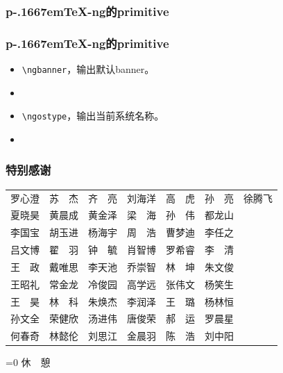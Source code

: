 \documentclass[dvipdfmx]{beamer}
\newcommand{\pTeX}{p\kern-.1667em\TeX}
\newcommand{\ptexng}{\pTeX-ng}
\begin{document}
%
\begin{frame}[fragile]
\frametitle{\bf \ptexng 的primitive}
\end{frame}
%
\begin{frame}[fragile]
\frametitle{\bf \ptexng 的primitive}
\begin{itemize}
\item \verb!\ngbanner!，输出默认banner。
\item \ngbanner
\item \verb!\ngostype!，输出当前系统名称。
\item \ngostype
\end{itemize}
\end{frame}
%
\begin{frame}[fragile]
\frametitle{\bf 特别感谢}
\begin{center}
\begin{tabular}{ccccccc}
罗心澄&苏　杰&齐　亮&刘海洋&高　虎&孙　亮&徐腾飞\\
夏晓昊&黄晨成&黄金泽&梁　海&孙　伟&都龙山&\\
李国宝&胡玉进&杨海宇&周　浩&曹梦迪&李任之&\\
吕文博&翟　羽&钟　毓&肖智博&罗希睿&李　清&\\
王　政&戴唯思&李天池&乔崇智&林　坤&朱文俊&\\
王昭礼&常金龙&冷俊园&高学远&张伟文&杨笑生&\\
王　昊&林　科&朱焕杰&李润泽&王　璐&杨林恒&\\
孙文全&荣健欣&汤进伟&唐俊荣&郝　运&罗晨星&\\%
何春奇&林懿伦&刘思江&金晨羽&陈　浩&刘中阳&\\
\end{tabular}
\end{center}
\end{frame}
%
\begin{frame}[fragile]
\begin{center}
\ifnum{}=0
\Huge 休　憩
\fi
\end{center}
\end{frame}
\end{document}
